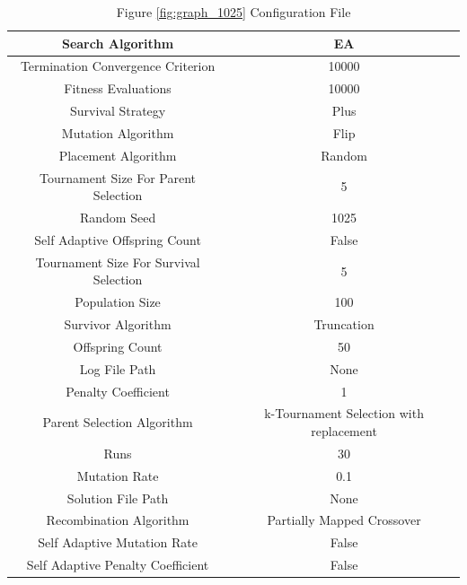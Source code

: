 \documentclass{standalone}
\begin{document}
\begin{table}[!htb]
	\centering
	\caption{Figure \ref{fig:graph_1025} Configuration File}
	\label{tab:graph_1025}
	\begin{tabular}{| c | c |}
		\hline
		Search Algorithm		& EA		 \\
		\hline
		Termination Convergence Criterion		& 10000		 \\
		\hline
		Fitness Evaluations		& 10000		 \\
		\hline
		Survival Strategy		& Plus		 \\
		\hline
		Mutation Algorithm		& Flip		 \\
		\hline
		Placement Algorithm		& Random		 \\
		\hline
		Tournament Size For Parent Selection		& 5		 \\
		\hline
		Random Seed		& 1025		 \\
		\hline
		Self Adaptive Offspring Count		& False		 \\
		\hline
		Tournament Size For Survival Selection		& 5		 \\
		\hline
		Population Size		& 100		 \\
		\hline
		Survivor Algorithm		& Truncation		 \\
		\hline
		Offspring Count		& 50		 \\
		\hline
		Log File Path		& None		 \\
		\hline
		Penalty Coefficient		& 1		 \\
		\hline
		Parent Selection Algorithm		& k-Tournament Selection with replacement		 \\
		\hline
		Runs		& 30		 \\
		\hline
		Mutation Rate		& 0.1		 \\
		\hline
		Solution File Path		& None		 \\
		\hline
		Recombination Algorithm		& Partially Mapped Crossover		 \\
		\hline
		Self Adaptive Mutation Rate		& False		 \\
		\hline
		Self Adaptive Penalty Coefficient		& False		 \\
		\hline
	\end{tabular}
\end{table}
\end{document}
